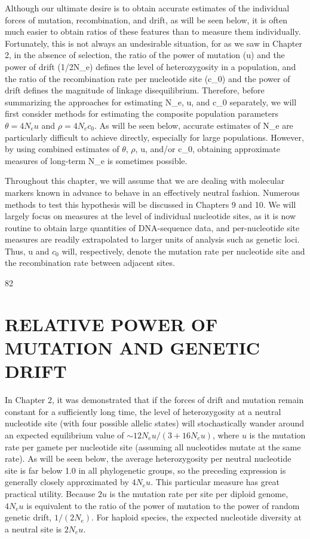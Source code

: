 \documentclass{article}
\begin{document}
Although our ultimate desire is to obtain accurate estimates of the individual forces of mutation, recombination, and drift, as will be seen below, it is often much easier to obtain ratios of these features than to measure them individually. Fortunately, this is not always an undesirable situation, for as we saw in Chapter 2, in the absence of selection, the ratio of the power of mutation (u) and the power of drift (1/2N_e) defines the level of heterozygosity in a population, and the ratio of the recombination rate per nucleotide site (c_0) and the power of drift defines the magnitude of linkage disequilibrium. Therefore, before summarizing the approaches for estimating N_e, u, and c_0 separately, we will first consider methods for estimating the composite population parameters  $ \theta = 4N_e u $ and  $ \rho = 4N_e c_0 $. As will be seen below, accurate estimates of N_e are particularly difficult to achieve directly, especially for large populations. However, by using combined estimates of  $ \theta $,  $ \rho $, u, and/or c_0, obtaining approximate measures of long-term N_e is sometimes possible.

Throughout this chapter, we will assume that we are dealing with molecular markers known in advance to behave in an effectively neutral fashion. Numerous methods to test this hypothesis will be discussed in Chapters 9 and 10. We will largely focus on measures at the level of individual nucleotide sites, as it is now routine to obtain large quantities of DNA-sequence data, and per-nucleotide site measures are readily extrapolated to larger units of analysis such as genetic loci. Thus, u and  $ c_{0} $ will, respectively, denote the mutation rate per nucleotide site and the recombination rate between adjacent sites.

82

\section{RELATIVE POWER OF MUTATION AND GENETIC DRIFT}
In Chapter 2, it was demonstrated that if the forces of drift and mutation remain constant for a sufficiently long time, the level of heterozygosity at a neutral nucleotide site (with four possible allelic states) will stochastically wander around an expected equilibrium value of  $ \sim12N_{e}u/(3+16N_{e}u) $, where  $ u $ is the mutation rate per gamete per nucleotide site (assuming all nucleotides mutate at the same rate). As will be seen below, the average heterozygosity per neutral nucleotide site is far below 1.0 in all phylogenetic groups, so the preceding expression is generally closely approximated by  $ 4N_{e}u $. This particular measure has great practical utility. Because  $ 2u $ is the mutation rate per site per diploid genome,  $ 4N_{e}u $ is equivalent to the ratio of the power of mutation to the power of random genetic drift,  $ 1/(2N_{e}) $. For haploid species, the expected nucleotide diversity at a neutral site is  $ 2N_{e}u $.
\end{document}
